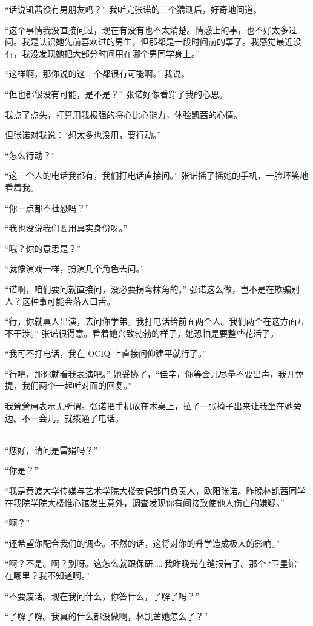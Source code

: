 \documentclass[UTF8]{ctexart}
\begin{document}
“话说凯茜没有男朋友吗？” 我听完张诺的三个猜测后，好奇地问道。

“这个事情我没直接问过，现在有没有也不太清楚。情感上的事，也不好太多过问。我是认识她先前喜欢过的男生，但那都是一段时间前的事了。我感觉最近没有，我没发现她把大部分时间用在哪个男同学身上。”

“这样啊，那你说的这三个都很有可能啊。” 我说。

“但也都很没有可能，是不是？” 张诺好像看穿了我的心思。

我点了点头，打算用我极强的将心比心能力，体验凯茜的心情。

但张诺对我说：“想太多也没用，要行动。”

“怎么行动？”

“这三个人的电话我都有，我们打电话直接问。” 张诺摇了摇她的手机，一脸坏笑地看着我。

“你一点都不社恐吗？”

“我也没说我们要用真实身份呀。”

“哦？你的意思是？”

“就像演戏一样，扮演几个角色去问。”

“诺啊，咱们要问就直接问，没必要拐弯抹角的。” 张诺这么做，岂不是在欺骗别人？这种事可能会落人口舌。

“行，你就真人出演，去问你学弟。我打电话给前面两个人。我们两个在这方面互不干涉。” 张诺很得意。看着她兴致勃勃的样子，她恐怕是要整些花活了。

“我可不打电话，我在 OCIQ 上直接问仰建平就行了。”

“行吧，那你就看我表演吧。” 她妥协了，“佳辛，你等会儿尽量不要出声，我开免提，我们两个一起听对面的回复。”

我耸耸肩表示无所谓。张诺把手机放在木桌上，拉了一张椅子出来让我坐在她旁边。不一会儿，就拨通了电话。

~\\

“您好，请问是雷娟吗？”

“你是？”

“我是黄渡大学传媒与艺术学院大楼安保部门负责人，欧阳张诺。昨晚林凯茜同学在我院学院大楼惟心馆发生意外，调查发现你有间接致使他人伤亡的嫌疑。”

“啊？”

“还希望你配合我们的调查。不然的话，这将对你的升学造成极大的影响。”

“啊？不是。啊？别呀。这怎么就跟保研……我昨晚光在缝报告了。那个 ‘卫星馆’ 在哪里？我不知道啊。”

“不要废话。现在我问什么，你答什么，了解了吗？”

“了解了解。我真的什么都没做啊，林凯茜她怎么了？”
\end{document}

